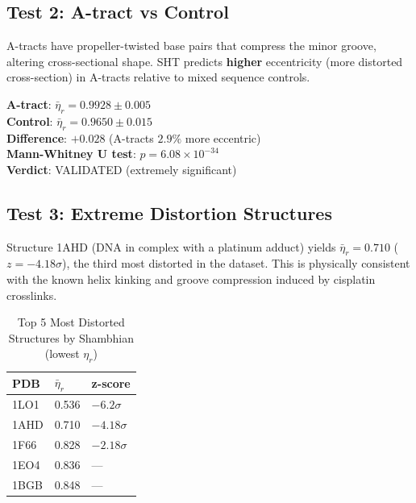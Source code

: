 \subsection{Test 2: A-tract vs Control}

A-tracts have propeller-twisted base pairs that compress the minor groove, altering cross-sectional shape. SHT predicts \textbf{higher} eccentricity (more distorted cross-section) in A-tracts relative to mixed sequence controls.

\begin{keyresult}
    \textbf{A-tract}: $\bar{\eta}_r = 0.9928 \pm 0.005$ \\
    \textbf{Control}: $\bar{\eta}_r = 0.9650 \pm 0.015$ \\
    \textbf{Difference}: $+0.028$ (A-tracts $2.9\%$ more eccentric) \\
    \textbf{Mann-Whitney U test}: $p = 6.08 \times 10^{-34}$ \\
    \textbf{Verdict}: VALIDATED (extremely significant)
\end{keyresult}

\subsection{Test 3: Extreme Distortion Structures}

Structure 1AHD (DNA in complex with a platinum adduct) yields $\bar{\eta}_r = 0.710$ ($z = -4.18\sigma$), the third most distorted in the dataset. This is physically consistent with the known helix kinking and groove compression induced by cisplatin crosslinks.

\begin{table}[h]
    \centering
    \caption{Top 5 Most Distorted Structures by Shambhian (lowest $\eta_r$)}
    \begin{tabular}{lll}
        \toprule
        \textbf{PDB} & \textbf{$\bar{\eta}_r$} & \textbf{z-score} \\
        \midrule
        1LO1 & 0.536 & $-6.2\sigma$ \\
        1AHD & 0.710 & $-4.18\sigma$ \\
        1F66 & 0.828 & $-2.18\sigma$ \\
        1EO4 & 0.836 & --- \\
        1BGB & 0.848 & --- \\
        \bottomrule
    \end{tabular}
\end{table}


